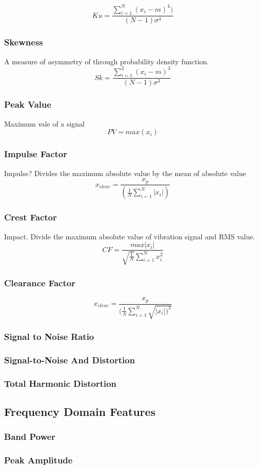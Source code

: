 \documentclass{article}
\begin{document}
$$ Ku = \frac{\sum^N_{i=1}(x_i-m)^4)}{(N-1)\sigma^4} $$ 
\subsubsection{Skewness} 
A measure of asymmetry of through probability density function.
$$ Sk = \frac{\sum^2_{i=1}(x_i-m)^3}{(N-1)\sigma^3} $$
\subsubsection{Peak Value}
Maximum vale of a signal
$$ PV = max(x_i) $$ 
\subsubsection{Impulse Factor} 
Impulse? Divides the maximum absolute value by the mean of absolute value
$$ x_{clear} = \frac{x_p}{(\frac{1}{N}\sum^N_{i=1}|x_i|)} $$  
\subsubsection{Crest Factor} 
Impact. Divide the maximum absolute value of vibration signal and
RMS value.
$$ CF = \frac{max|x_i|}{\sqrt{\frac{1}{N}}\sum^N_{i=1}x^2_i} $$
\subsubsection{Clearance Factor} 

$$ x_{clear} = \frac{x_p}{(\frac{1}{N}\sum^N_{i=1}\sqrt{|x_i|)^2}} $$
\subsubsection{Signal to Noise Ratio} 
\subsubsection{Signal-to-Noise And Distortion} 
\subsubsection{Total Harmonic Distortion}   
\subsection{Frequency Domain Features}
\subsubsection{Band Power}
\subsubsection{Peak Amplitude}
\end{document}
